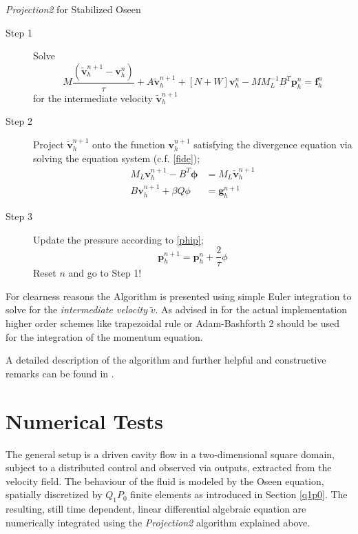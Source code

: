 \documentclass[a4paper,10pt,BCOR=15mm]{scrbook}
\begin{document}

\begin{algorithm}
\caption{\textit{Projection2} for Stabilized Oseen}
\label{alg:GS}

\begin{description}
 \item[Step 1] Solve
\begin{equation*}
 M\frac{(\tilde {\mathbf v}_h^{n+1}-\mathbf v_h^n)}{\tau}+A\tilde {\mathbf v}_h^{n+1}+[N+W]\mathbf v_h^n-MM_L^{-1}B^T\mathbf p_h^n=\mathbf f_h^n
\end{equation*}
for the intermediate velocity $\tilde {\mathbf v}_h^{n+1}$
\item[Step 2] Project $\tilde {\mathbf v}_h^{n+1}$ onto the function $\mathbf v_h^{n+1}$ satisfying the divergence equation via solving the equation system (c.f. \eqref{fide});
\begin{align}\label{spp}
 M_L \mathbf v_h^{n+1} -B^T \mathbf{ \phi} &= M_L \tilde {\mathbf v}_h^{n+1} \\
 B \mathbf v_h^{n+1} + \beta Q \phi &= \mathbf g_h^{n+1} \label{betq}
\end{align}
\item[Step 3]
Update the pressure according to \eqref{phip};
\begin{equation*}
 \mathbf p_h^{n+1} = \mathbf p_h^n+\frac{2}{\tau}\phi
\end{equation*}
Reset $n$ and go to Step 1!
 \end{description}
\end{algorithm}

 For clearness reasons the Algorithm is presented using simple Euler integration to solve for the \textit{intermediate velocity} $\tilde v$. As advised in \citep[p.~852]{gre1} for the actual implementation higher order schemes like trapezoidal rule or Adam-Bashforth 2 should be used for the integration of the momentum equation.

A detailed description of the algorithm and further helpful and constructive remarks can be found in \citep{gre1,grea,grc2}. 

\chapter{Numerical Tests}\label{numte}

The general setup is a driven cavity flow in a two-dimensional square domain, subject to a distributed control and observed via outputs, extracted from the velocity field. The behaviour of the fluid is modeled by the Oseen equation, spatially discretized by $Q_1P_0$ finite elements as introduced in Section \ref{q1p0}. The resulting, still time dependent, linear differential algebraic equation are numerically integrated using the \textit{Projection2} algorithm explained above. 
\end{document}
